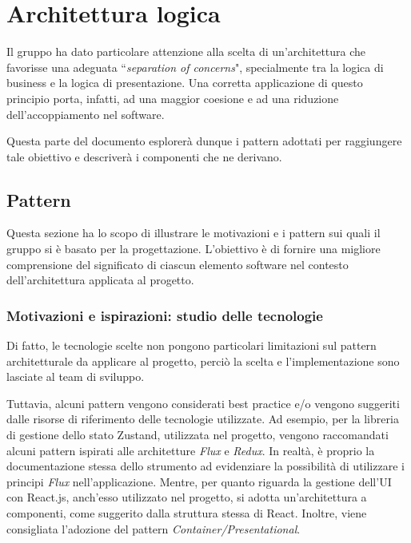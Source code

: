 \newpage
\section{Architettura logica}\label{sec:architettura_logica}
Il gruppo ha dato particolare attenzione alla scelta di un'architettura che favorisse una adeguata ``\textit{separation of concerns}", specialmente tra la logica di business e la logica di presentazione. Una corretta applicazione di questo principio porta, infatti, ad una maggior coesione e ad una riduzione dell'accoppiamento nel software.

Questa parte del documento esplorerà dunque i pattern adottati per raggiungere tale obiettivo e descriverà i componenti che ne derivano.

\subsection{Pattern}\label{sec:pattern_e_tecnologie}
Questa sezione ha lo scopo di illustrare le motivazioni e i pattern sui quali il gruppo si è basato per la progettazione. L'obiettivo è di fornire una migliore comprensione del significato di ciascun elemento software nel contesto dell'architettura applicata al progetto.

\subsubsection{Motivazioni e ispirazioni: studio delle tecnologie}
\par Di fatto, le tecnologie scelte non pongono particolari limitazioni sul pattern architetturale da applicare al progetto, perciò la scelta e l'implementazione sono lasciate al team di sviluppo. 

Tuttavia, alcuni pattern vengono considerati best practice e/o vengono suggeriti dalle risorse di riferimento delle tecnologie utilizzate. Ad esempio, per la libreria di gestione dello stato Zustand, utilizzata nel progetto, vengono raccomandati alcuni pattern ispirati alle architetture \textit{Flux} e \textit{Redux}. In realtà, è proprio la documentazione stessa dello strumento ad evidenziare la possibilità di utilizzare i principi \textit{Flux} nell'applicazione. Mentre, per quanto riguarda la gestione dell'UI con React.js, anch'esso utilizzato nel progetto, si adotta un'architettura a componenti, come suggerito dalla struttura stessa di React. Inoltre, viene consigliata l'adozione del pattern \textit{Container/Presentational}.

